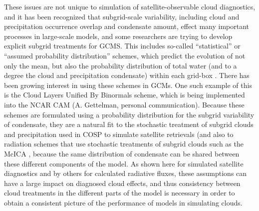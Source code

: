 These issues are not unique to simulation of satellite-observable cloud
diagnostics, and it has been recognized that subgrid-scale variability,
including cloud and precipitation occurrence overlap and condensate
amount, effect many important processes in large-scale models, and some
researchers are trying to develop explicit subgrid treatments for GCMS.
This includes so-called ``statistical'' or ``assumed probability
distribution'' schemes, which predict the evolution of not only the
mean, but also the probability distribution of total water (and to a
degree the cloud and precipitation condensate) within each grid-box
\citep[e.g.,][]{tompkins_2002}. There has been growing interest in using
these schemes in GCMs. One such example of this is the Cloud Layers
Unified By Binormals \citep[CLUBB;][]{golaz_et_al_2002} scheme, which is
being implemented into the NCAR CAM (A. Gettelman, personal
communication). Because these schemes are formulated using a probability
distribution for the subgrid variability of condensate, they are a
natural fit to the stochastic treatment of subgrid clouds and
precipitation used in COSP to simulate satellite retrievals (and also to
radiation schemes that use stochastic treatments of subgrid clouds such
as the McICA \citep{pincus_et_al_2003}, because the same distribution of
condensate can be shared between these different components of the
model. As shown here for simulated satellite diagnostics and by others
for calculated radiative fluxes, these assumptions can have a large
impact on diagnosed cloud effects, and thus consistency between cloud
treatments in the different parts of the model is necessary in order to
obtain a consistent picture of the performance of models in simulating
clouds.
